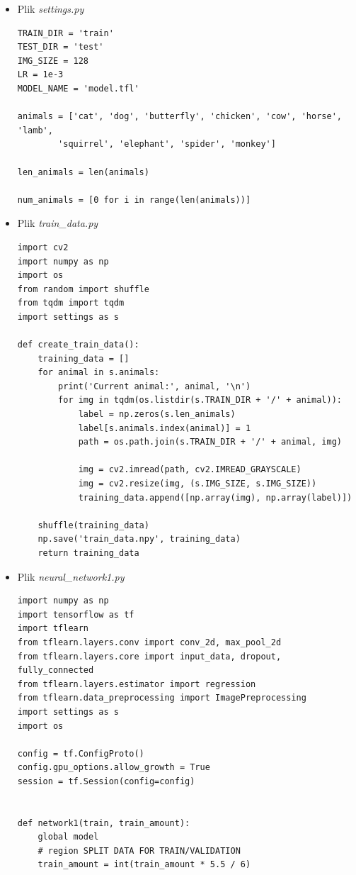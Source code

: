 \documentclass[12pt,a4paper]{article}
\begin{document}
\begin{itemize}
    \item Plik \textit{settings.py}
	{\fontsize{9}{10}\selectfont
    	\begin{verbatim}
TRAIN_DIR = 'train'
TEST_DIR = 'test'
IMG_SIZE = 128
LR = 1e-3
MODEL_NAME = 'model.tfl'

animals = ['cat', 'dog', 'butterfly', 'chicken', 'cow', 'horse', 'lamb',
        'squirrel', 'elephant', 'spider', 'monkey']

len_animals = len(animals)

num_animals = [0 for i in range(len(animals))]
        \end{verbatim}
    }
    \item Plik \textit{train\_data.py}
	{\fontsize{9}{10}\selectfont
    	\begin{verbatim}
import cv2
import numpy as np
import os
from random import shuffle
from tqdm import tqdm
import settings as s

def create_train_data():
    training_data = []
    for animal in s.animals:
        print('Current animal:', animal, '\n')
        for img in tqdm(os.listdir(s.TRAIN_DIR + '/' + animal)):
            label = np.zeros(s.len_animals)
            label[s.animals.index(animal)] = 1
            path = os.path.join(s.TRAIN_DIR + '/' + animal, img)

            img = cv2.imread(path, cv2.IMREAD_GRAYSCALE)
            img = cv2.resize(img, (s.IMG_SIZE, s.IMG_SIZE))
            training_data.append([np.array(img), np.array(label)])

    shuffle(training_data)
    np.save('train_data.npy', training_data)
    return training_data
        \end{verbatim}
    }
    \item Plik \textit{neural\_network1.py}
	{\fontsize{9}{10}\selectfont
    	\begin{verbatim}
import numpy as np
import tensorflow as tf
import tflearn
from tflearn.layers.conv import conv_2d, max_pool_2d
from tflearn.layers.core import input_data, dropout, fully_connected
from tflearn.layers.estimator import regression
from tflearn.data_preprocessing import ImagePreprocessing
import settings as s
import os

config = tf.ConfigProto()
config.gpu_options.allow_growth = True
session = tf.Session(config=config)


def network1(train, train_amount):
    global model
    # region SPLIT DATA FOR TRAIN/VALIDATION
    train_amount = int(train_amount * 5.5 / 6)


\end{verbatim}}
\end{itemize}
\end{document}
